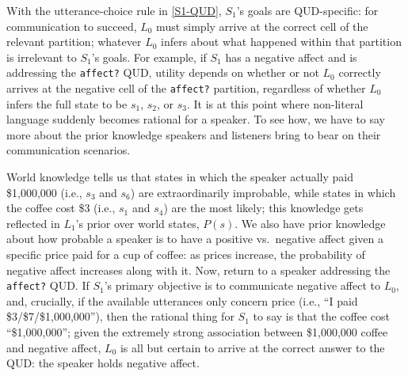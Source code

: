 \documentclass{sp}
\begin{document}
With the utterance-choice rule in \eqref{S1-QUD}, $S_1$'s goals are QUD-specific: for communication to succeed, $L_0$ must simply arrive at the correct cell of the relevant partition; whatever $L_0$ infers about what happened within that partition is irrelevant to $S_1$'s goals. For example, if $S_1$ has a negative affect and is addressing the \texttt{affect?} QUD, utility depends on whether or not $L_0$ correctly arrives at the negative cell of the \texttt{affect?} partition, regardless of whether $L_0$ infers the full state to be $s_1$, $s_2$, or $s_3$. It is at this point where non-literal language suddenly becomes rational for a speaker. To see how, we have to say more about the prior knowledge speakers and listeners bring to bear on their communication scenarios.

World knowledge tells us that states in which the speaker actually paid \$1,000,000 (i.e., $s_3$ and $s_6$) are extraordinarily improbable, while states in which the coffee cost \$3 (i.e., $s_1$ and $s_4$) are the most likely; this knowledge gets reflected in $L_1$'s prior over world states, $P(s)$. We also have prior knowledge about how probable a speaker is to have a positive vs.~negative affect given a specific price paid for a cup of coffee: as prices increase, the probability of negative affect increases along with it. Now, return to a speaker addressing the \texttt{affect?} QUD. If $S_1$'s primary objective is to communicate negative affect to $L_0$, and, crucially, if the available utterances only concern price (i.e., ``I paid \$3/\$7/\$1,000,000''), then the rational thing for $S_1$ to say is that the coffee cost ``\$1,000,000''; given the extremely strong association between \$1,000,000 coffee and negative affect, $L_0$ is all but certain to arrive at the correct answer to the QUD: the speaker holds negative affect.
\end{document}
